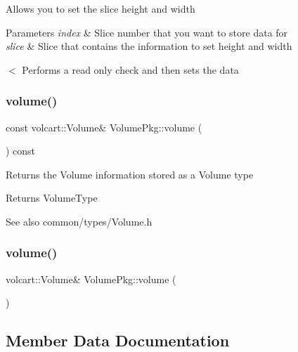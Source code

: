 Allows you to set the slice height and width 
\begin{DoxyParams}{Parameters}
{\em index} & Slice number that you want to store data for \\
\hline
{\em slice} & Slice that contains the information to set height and width \\
\hline
\end{DoxyParams}
$<$ Performs a read only check and then sets the data \hypertarget{classVolumePkg_af346c954f18704b60f4b518412d5b0b0}{}\label{classVolumePkg_af346c954f18704b60f4b518412d5b0b0} 
\subsubsection{\texorpdfstring{volume()}{volume()}\hspace{0.1cm}{\footnotesize\ttfamily [1/2]}}
{\footnotesize\ttfamily const volcart\+::\+Volume\& Volume\+Pkg\+::volume (\begin{DoxyParamCaption}{ }\end{DoxyParamCaption}) const\hspace{0.3cm}{\ttfamily [inline]}}

Returns the Volume information stored as a Volume type \begin{DoxyReturn}{Returns}
Volume\+Type 
\end{DoxyReturn}
\begin{DoxySeeAlso}{See also}
common/types/\+Volume.\+h 
\end{DoxySeeAlso}
\hypertarget{classVolumePkg_a49a10fff903e76fe8fbd72793621eaa2}{}\label{classVolumePkg_a49a10fff903e76fe8fbd72793621eaa2} 
\subsubsection{\texorpdfstring{volume()}{volume()}\hspace{0.1cm}{\footnotesize\ttfamily [2/2]}}
{\footnotesize\ttfamily volcart\+::\+Volume\& Volume\+Pkg\+::volume (\begin{DoxyParamCaption}{ }\end{DoxyParamCaption})\hspace{0.3cm}{\ttfamily [inline]}}



\subsection{Member Data Documentation}
\hypertarget{classVolumePkg_a032ffe2acb8dcb5efe26312a3730aa85}{}\label{classVolumePkg_a032ffe2acb8dcb5efe26312a3730aa85} 
